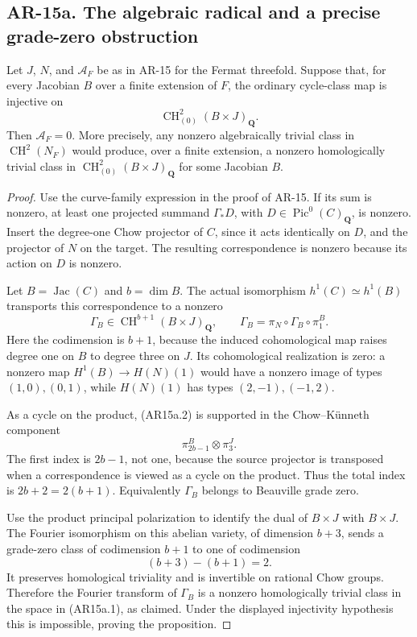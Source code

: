 \subsection*{AR-15a. The algebraic radical and a precise grade-zero obstruction}

\begin{proposition}[AR-15a]
Let \(J\), \(N\), and \(\mathcal A_F\) be as in AR-15 for the Fermat
threefold. Suppose that, for every Jacobian \(B\) over a finite extension
of \(F\), the ordinary cycle-class map is injective on
\[
             \operatorname{CH}^2_{(0)}(B\times J)_{\mathbf Q}.
             \tag{AR15a.1}
\]
Then \(\mathcal A_F=0\). More precisely, any nonzero algebraically
trivial class in \(\operatorname{CH}^2(N_F)\) would produce, over a
finite extension, a nonzero homologically trivial class in
\(\operatorname{CH}^2_{(0)}(B\times J)_{\mathbf Q}\) for some Jacobian
\(B\).
\end{proposition}

\begin{proof}
Use the curve-family expression in the proof of AR-15. If its sum is
nonzero, at least one projected summand
\(\Gamma_*D\), with \(D\in\operatorname{Pic}^0(C)_{\mathbf Q}\),
is nonzero. Insert the degree-one Chow projector of \(C\), since it
acts identically on \(D\), and the projector of \(N\) on the target.
The resulting correspondence is nonzero because its action on \(D\)
is nonzero.

Let \(B=\operatorname{Jac}(C)\) and \(b=\dim B\). The actual isomorphism
\(h^1(C)\simeq h^1(B)\) transports this correspondence to a nonzero
\[
 \Gamma_B\in\operatorname{CH}^{b+1}(B\times J)_{\mathbf Q},
 \qquad
 \Gamma_B=\pi_N\circ\Gamma_B\circ\pi_1^B.
 \tag{AR15a.2}
\]
Here the codimension is \(b+1\), because the induced cohomological
map raises degree one on \(B\) to degree three on \(J\).
Its cohomological realization is zero: a nonzero map
\(H^1(B)\to H(N)(1)\) would have a nonzero image of types
\((1,0),(0,1)\), while \(H(N)(1)\) has types
\((2,-1),(-1,2)\).

As a cycle on the product, (AR15a.2) is supported in the Chow--K\"unneth
component
\[
        \pi_{2b-1}^B\otimes\pi_3^J.
\]
The first index is \(2b-1\), not one, because the source projector
is transposed when a correspondence is viewed as a cycle on the
product. Thus the total index is \(2b+2=2(b+1)\).
Equivalently \(\Gamma_B\) belongs to Beauville grade zero.

Use the product principal polarization to identify the dual of
\(B\times J\) with \(B\times J\). The Fourier isomorphism on this
abelian variety, of dimension \(b+3\), sends a grade-zero class of codimension \(b+1\)
to one of codimension
\[
             (b+3)-(b+1)=2.
\]
It preserves homological triviality and is invertible on rational
Chow groups. Therefore the Fourier transform of \(\Gamma_B\) is a
nonzero homologically trivial class in the space in (AR15a.1), as
claimed. Under the displayed injectivity hypothesis this is
impossible, proving the proposition.
\end{proof}

